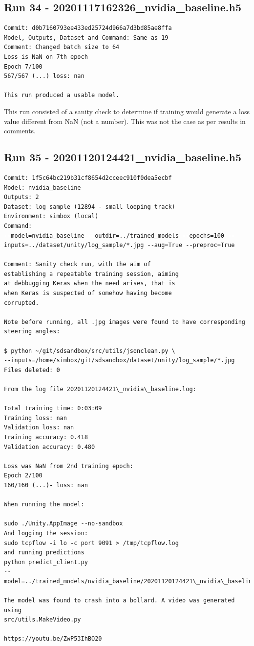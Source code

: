 \subsection{Run 34 - 20201117162326\_nvidia\_baseline.h5}
\begin{verbatim}
Commit: d0b7160793ee433ed25724d966a7d3bd85ae8ffa  
Model, Outputs, Dataset and Command: Same as 19
Comment: Changed batch size to 64
Loss is NaN on 7th epoch
Epoch 7/100
567/567 (...) loss: nan

This run produced a usable model.
\end{verbatim}

This run consisted of a sanity check to determine if training would generate a loss value different from NaN (not a number). This was not the case as per results in comments.

\subsection{Run 35 - 20201120124421\_nvidia\_baseline.h5}
\begin{verbatim}
Commit: 1f5c64bc219b31cf8654d2cceec910f0dea5ecbf
Model: nvidia_baseline
Outputs: 2
Dataset: log_sample (12894 - small looping track)
Environment: simbox (local)
Command: 
--model=nvidia_baseline --outdir=../trained_models --epochs=100 --inputs=../dataset/unity/log_sample/*.jpg --aug=True --preproc=True

Comment: Sanity check run, with the aim of
establishing a repeatable training session, aiming
at debbugging Keras when the need arises, that is
when Keras is suspected of somehow having become 
corrupted. 

Note before running, all .jpg images were found to have corresponding steering angles:

$ python ~/git/sdsandbox/src/utils/jsonclean.py \
--inputs=/home/simbox/git/sdsandbox/dataset/unity/log_sample/*.jpg
Files deleted: 0

From the log file 20201120124421\_nvidia\_baseline.log:

Total training time: 0:03:09
Training loss: nan
Validation loss: nan
Training accuracy: 0.418
Validation accuracy: 0.480

Loss was NaN from 2nd training epoch:
Epoch 2/100
160/160 (...)- loss: nan

When running the model:

sudo ./Unity.AppImage --no-sandbox
And logging the session:
sudo tcpflow -i lo -c port 9091 > /tmp/tcpflow.log
and running predictions
python predict_client.py
--model=../trained_models/nvidia_baseline/20201120124421\_nvidia\_baseline.h5

The model was found to crash into a bollard. A video was generated using 
src/utils.MakeVideo.py

https://youtu.be/ZwP53IhBO20

\end{verbatim}

